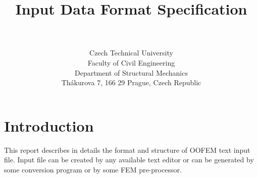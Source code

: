 \documentclass[draft]{article}
\begin{document}
\title{\oofem Input Data Format Specification}
\author{\bp \\ \\
Czech Technical University\\
Faculty of Civil Engineering\\
Department of Structural Mechanics\\
Th\'akurova 7, 166 29 Prague, Czech Republic
}
\maketitle

\newpage
\tableofcontents
\newpage
\section{Introduction}
This report describes in details the format and structure of OOFEM
text input file. Input file can be created by any available text editor or can be generated
by some conversion program or by some FEM pre-processor. 
\end{document}
